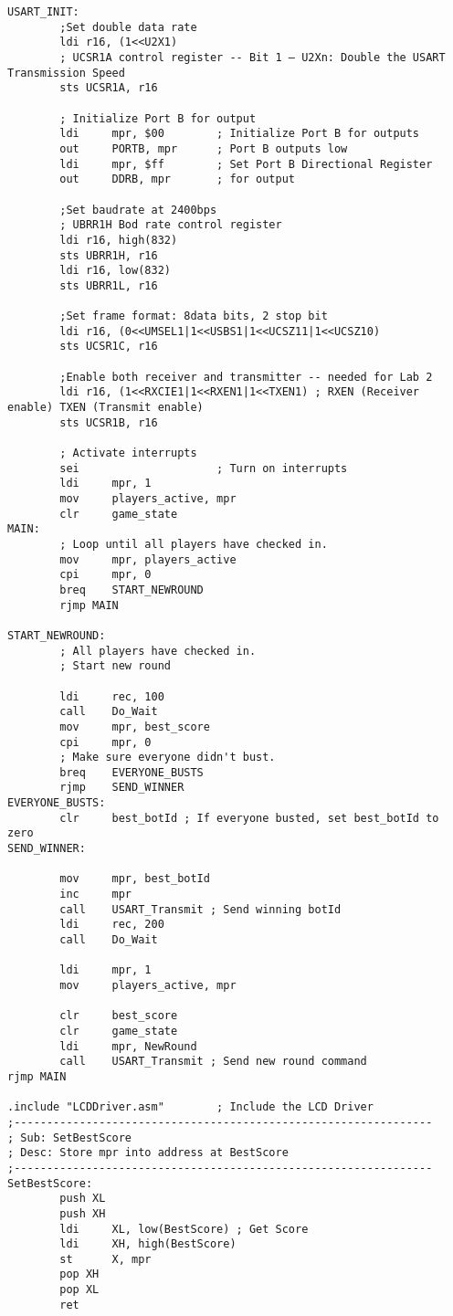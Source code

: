 \documentclass[10pt,letterpaper]{article}
\begin{document}
\begin{verbatim}
USART_INIT:
        ;Set double data rate
        ldi r16, (1<<U2X1)
        ; UCSR1A control register -- Bit 1 – U2Xn: Double the USART Transmission Speed
        sts UCSR1A, r16

        ; Initialize Port B for output
        ldi     mpr, $00        ; Initialize Port B for outputs
        out     PORTB, mpr      ; Port B outputs low
        ldi     mpr, $ff        ; Set Port B Directional Register
        out     DDRB, mpr       ; for output

        ;Set baudrate at 2400bps
        ; UBRR1H Bod rate control register
        ldi r16, high(832)
        sts UBRR1H, r16
        ldi r16, low(832)
        sts UBRR1L, r16

		;Set frame format: 8data bits, 2 stop bit
        ldi r16, (0<<UMSEL1|1<<USBS1|1<<UCSZ11|1<<UCSZ10)
        sts UCSR1C, r16

        ;Enable both receiver and transmitter -- needed for Lab 2
        ldi r16, (1<<RXCIE1|1<<RXEN1|1<<TXEN1) ; RXEN (Receiver enable) TXEN (Transmit enable)
        sts UCSR1B, r16

		; Activate interrupts
		sei						; Turn on interrupts
        ldi     mpr, 1
        mov     players_active, mpr
        clr     game_state
MAIN:
        ; Loop until all players have checked in.
        mov     mpr, players_active
        cpi     mpr, 0
        breq    START_NEWROUND
        rjmp MAIN

START_NEWROUND:
        ; All players have checked in.
        ; Start new round

        ldi     rec, 100
        call    Do_Wait
        mov     mpr, best_score
        cpi     mpr, 0
        ; Make sure everyone didn't bust.
        breq    EVERYONE_BUSTS
        rjmp    SEND_WINNER
EVERYONE_BUSTS:
        clr     best_botId ; If everyone busted, set best_botId to zero
SEND_WINNER:

        mov     mpr, best_botId
        inc     mpr
        call    USART_Transmit ; Send winning botId
        ldi     rec, 200
        call    Do_Wait

        ldi     mpr, 1
        mov     players_active, mpr

        clr     best_score
        clr     game_state
        ldi     mpr, NewRound
        call    USART_Transmit ; Send new round command
rjmp MAIN

.include "LCDDriver.asm"		; Include the LCD Driver
;----------------------------------------------------------------
; Sub: SetBestScore
; Desc: Store mpr into address at BestScore
;----------------------------------------------------------------
SetBestScore:
        push XL
        push XH
		ldi		XL, low(BestScore) ; Get Score
		ldi		XH, high(BestScore)
        st      X, mpr
        pop XH
        pop XL
        ret


\end{verbatim}
\end{document}
